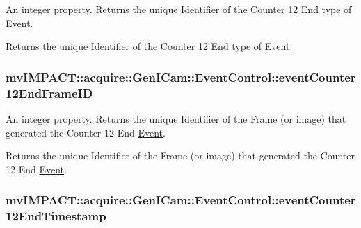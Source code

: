 An integer property. Returns the unique Identifier of the Counter 12 End type of \hyperlink{classmv_i_m_p_a_c_t_1_1acquire_1_1_event}{Event}. 

Returns the unique Identifier of the Counter 12 End type of \hyperlink{classmv_i_m_p_a_c_t_1_1acquire_1_1_event}{Event}. \hypertarget{classmv_i_m_p_a_c_t_1_1acquire_1_1_gen_i_cam_1_1_event_control_a75174ec72806035e470e10b255b12915}{
\subsubsection[{event\+Counter12\+End\+Frame\+I\+D}]{ mv\+I\+M\+P\+A\+C\+T\+::acquire\+::\+Gen\+I\+Cam\+::\+Event\+Control\+::event\+Counter12\+End\+Frame\+I\+D}}\label{classmv_i_m_p_a_c_t_1_1acquire_1_1_gen_i_cam_1_1_event_control_a75174ec72806035e470e10b255b12915}


An integer property. Returns the unique Identifier of the Frame (or image) that generated the Counter 12 End \hyperlink{classmv_i_m_p_a_c_t_1_1acquire_1_1_event}{Event}. 

Returns the unique Identifier of the Frame (or image) that generated the Counter 12 End \hyperlink{classmv_i_m_p_a_c_t_1_1acquire_1_1_event}{Event}. \hypertarget{classmv_i_m_p_a_c_t_1_1acquire_1_1_gen_i_cam_1_1_event_control_a3872ff085db5a2cc797ee0a6c0d5605c}{
\subsubsection[{event\+Counter12\+End\+Timestamp}]{ mv\+I\+M\+P\+A\+C\+T\+::acquire\+::\+Gen\+I\+Cam\+::\+Event\+Control\+::event\+Counter12\+End\+Timestamp}}\label{classmv_i_m_p_a_c_t_1_1acquire_1_1_gen_i_cam_1_1_event_control_a3872ff085db5a2cc797ee0a6c0d5605c}



